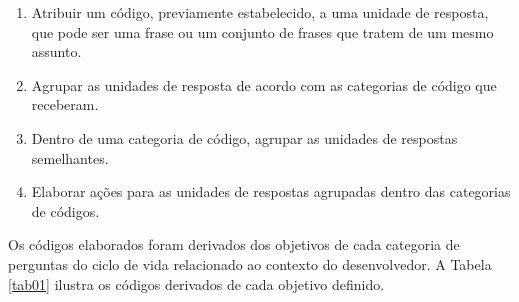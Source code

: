 \begin{enumerate}
\item Atribuir um código, previamente estabelecido, a uma unidade de resposta, que pode ser uma frase ou um conjunto de frases que tratem de um mesmo assunto.
\item Agrupar as unidades de resposta de acordo com as categorias de código que receberam.
\item Dentro de uma categoria de código, agrupar as unidades de respostas semelhantes.
\item Elaborar ações para as unidades de respostas agrupadas dentro das categorias de códigos.
\end{enumerate}

Os códigos elaborados foram derivados dos objetivos de cada categoria de perguntas do ciclo de vida relacionado ao contexto do desenvolvedor. A Tabela \ref{tab01} ilustra os códigos derivados de cada objetivo definido.

